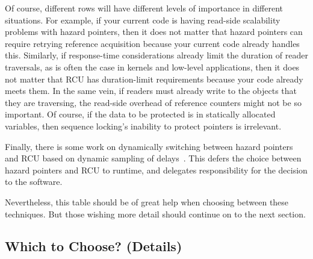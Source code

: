 \QuickQuizEnd

Of course, different rows will have different levels of importance in
different situations.
For example, if your current code is having read-side scalability problems
with hazard pointers, then it does not matter that hazard pointers can require
retrying reference acquisition because your current code already handles
this.
Similarly, if response-time considerations already limit the duration
of reader traversals, as is often the case in kernels and low-level
applications, then it does not matter that RCU has duration-limit
requirements because your code already meets them.
In the same vein, if readers must already write to the objects that they
are traversing, the read-side overhead of reference counters might
not be so important.
Of course, if the data to be protected is in statically allocated variables,
then sequence locking's inability to protect pointers is irrelevant.

Finally, there is some work on dynamically switching between hazard
pointers and RCU based on dynamic sampling of
delays~\cite{Balmau:2016:FRM:2935764.2935790}.
This defers the choice between hazard pointers and RCU to runtime,
and delegates responsibility for the decision to the software.

Nevertheless, this table should be of great help when choosing between
these techniques.
But those wishing more detail should continue on to the next section.

\subsection{Which to Choose? (Details)}
\label{sec:defer:Which to Choose? (Details)}


